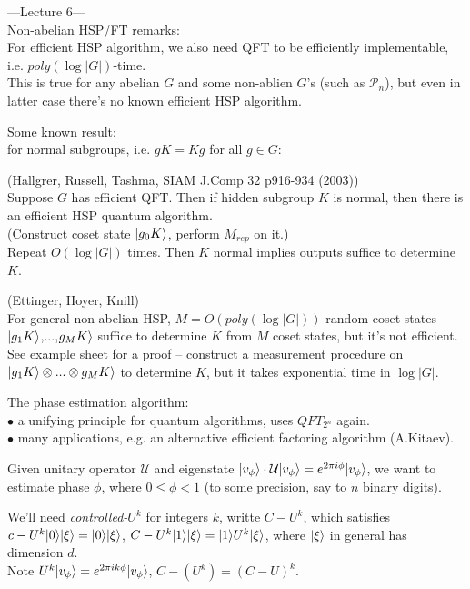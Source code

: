 \documentclass[a4paper]{article}
\begin{document}
---Lecture 6---\\
Non-abelian HSP/FT remarks:\\
For efficient HSP algorithm, we also need QFT to be efficiently implementable, i.e. $poly(\log|G|)$-time.\\
This is true for any abelian $G$ and some non-ablien $G$'s (such as $\mathcal{P}_n$), but even in latter case there's no known efficient HSP algorithm.

Some known result:\\
for normal subgroups, i.e. $gK= Kg$ for all $g \in G$:
\begin{thm} (Hallgrer, Russell, Tashma, SIAM J.Comp 32 p916-934 (2003))\\
    Suppose $G$ has efficient QFT. Then if hidden subgroup $K$ is normal, then there is an efficient HSP quantum algorithm.\\
    (Construct coset state $|g_0 K\rangle$, perform $M_{rep}$ on it.)\\
    Repeat $O(\log|G|)$ times. Then $K$ normal implies outputs suffice to determine $K$.
\end{thm}

\begin{thm} (Ettinger, Hoyer, Knill)\\
    For general non-abelian HSP, $M=O(poly(\log|G|))$ random coset states $|g_1K\rangle$,...,$g_M K\rangle$ suffice to determine $K$ from $M$ coset states, but it's not efficient.\\
    See example sheet for a proof -- construct a measurement procedure on $|g_1K\rangle \otimes ... \otimes g_MK\rangle$ to determine $K$, but it takes exponential time in $\log|G|$.
\end{thm}

The phase estimation algorithm:\\
$\bullet$ a unifying principle for quantum algorithms, uses $QFT_{2^n}$ again.\\
$\bullet$ many applications, e.g. an alternative efficient factoring algorithm (A.Kitaev).

Given unitary operator $\mathcal{U}$ and eigenstate $|v_\phi \rangle \cdot \mathcal{U} | v_{\phi}\rangle = e^{2\pi i\phi} | v_\phi\rangle$, we want to estimate phase $\phi$, where $0 \leq \phi < 1$ (to some precision, say to $n$ binary digits).

We'll need \emph{controlled-$U^k$} for integers $k$, writte $C-U^k$, which satisfies $c-U^k |0\rangle |\xi\rangle = |0\rangle |\xi\rangle$, $C-U^k |1\rangle |\xi\rangle = |1\rangle U^k|\xi\rangle$, where $|\xi\rangle$ in general has dimension $d$.\\
Note $U^k |v_\phi\rangle = e^{2\pi ik\phi} | v_\phi\rangle$, $C-(U^k) = (C-U)^k$.
\end{document}
